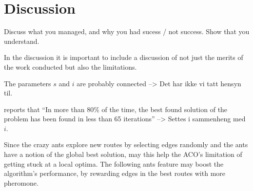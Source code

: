 \section{Discussion}

Discuss what you managed, and why you had sucess / not success. 
Show that you understand.

In the discussion it is important to include a discussion of not just the merits of the work conducted but also the limitations. 

The parameters $s$ and $i$ are probably connected --> Det har ikke vi tatt hensyn til. 

\citet{poorzahedy11} reports that ``In more than 80\% of the time, the best found solution of the problem has been found in less than 65 iterations'' --> Settes i sammenheng med $i$.

Since the crazy ants explore new routes by selecting edges randomly and the ants have a notion of the global best solution, may this help the ACO's limitation of getting stuck at a local optima. The following ants feature may boost the algorithm's performance, by rewarding edges in the best routes with more pheromone.


